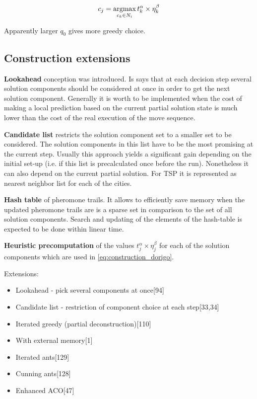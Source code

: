 \documentclass[12pt]{article}
\begin{document}
\begin{equation}
c_j = \operatornamewithlimits{argmax}\limits_{c_k \in N_i} t_k^\alpha \times \eta_k^\beta
\label{eq:construction_dorigo}
\end{equation}

Apparently larger $q_0$ gives more greedy choice.

\subsection{Construction extensions}

\textbf{Lookahead} conception was introduced. Is says that at each decision step several solution components should be considered at once in order to get the next solution component. Generally it is worth to be implemented when the cost of making a local prediction based on the current partial solution state is much lower than the cost of the real execution of the move sequence.

\textbf{Candidate list} restricts the solution component set to a smaller set to be considered. The solution components in this list have to be the most promising at the current step. Usually this approach yields a significant gain depending on the initial set-up (i.e. if this list is precalculated once before the run). Nonetheless it can also depend on the current partial solution. For TSP it is represented as nearest neighbor list for each of the cities.

\textbf{Hash table} of pheromone trails. It allows to efficiently save memory when the updated pheromone trails are is a sparse set in comparison to the set of all solution components. Search and updating of the elements of the hash-table is expected to be done within linear time.

\textbf{Heuristic precomputation} of the values $t_j^\alpha \times \eta_j^\beta$ for each of the solution components which are used in \eqref{eq:construction_dorigo}.

Extensions:
\begin{itemize}
\item {Lookahead - pick several components at once[94]}
\item {Candidate list - restriction of component choice at each step[33,34]}
\item {Iterated greedy (partial deconstruction)[110]}
\item {With external memory[1]}
\item {Iterated ants[129]}
\item {Cunning ants[128]}
\item {Enhanced ACO[47]}
\end{itemize}
\end{document}
